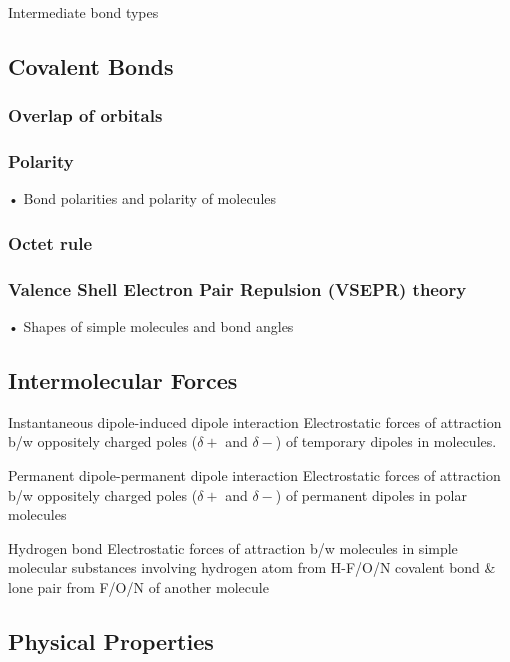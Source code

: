 Intermediate bond types

\subsection{Covalent Bonds}
\subsubsection{Overlap of orbitals}
\subsubsection{Polarity}
• Bond polarities and polarity of molecules
\subsubsection{Octet rule}
\subsubsection{Valence Shell Electron Pair Repulsion (VSEPR) theory}
• Shapes of simple molecules and bond angles

\subsection{Intermolecular Forces}
\begin{defn}{Instantaneous dipole-induced dipole interaction}{}
Electrostatic forces of attraction b/w oppositely charged poles ($\delta+$ and $\delta-$) of temporary dipoles in molecules.
\end{defn}

\begin{defn}{Permanent dipole-permanent dipole interaction}{}
Electrostatic forces of attraction b/w oppositely charged poles ($\delta+$ and $\delta-$) of permanent dipoles in polar molecules
\end{defn}

\begin{defn}{Hydrogen bond}{}
Electrostatic forces of attraction b/w molecules in simple molecular substances involving hydrogen atom from H-F/O/N covalent bond \& lone pair from F/O/N of another molecule
\end{defn}

\subsection{Physical Properties}

\pagebreak

